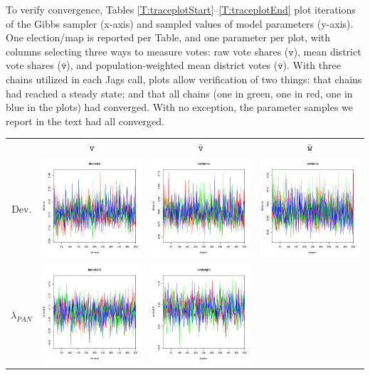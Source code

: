 \documentclass[letter,12pt]{article}
\begin{document}
To verify convergence, Tables \ref{T:traceplotStart}--\ref{T:traceplotEnd} plot iterations of the Gibbs sampler (x-axis) and sampled values of model parameters (y-axis). One election/map is reported per Table, and one parameter per plot, with columns selecting three ways to measure votes: raw vote shares ($\texttt{v}$), mean district vote shares ($\bar{\texttt{v}}$), and population-weighted mean district votes ($\bar{\texttt{v}}$). With three chains utilized in each Jags call, plots allow verification of two things: that chains had reached a steady state; and that all chains (one in green, one in red, one in blue in the plots) had converged. With no exception, the parameter samples we report in the text had all converged.

\begin{table}
\centering
\begin{tabular}{cccc}
                     & $\texttt{v}$ & $\bar{\texttt{v}}$ & $\bar{\texttt{w}}$ \\ 
    Dev.             & \includegraphics[width=.15\columnwidth]{../graphs/traceplots/2003d97v_1.pdf} &
                        \includegraphics[width=.15\columnwidth]{../graphs/traceplots/2003d97vbar_1.pdf} &
                         \includegraphics[width=.15\columnwidth]{../graphs/traceplots/2003d97wbar_1.pdf} \\
    $\lambda_{PAN}$   & \includegraphics[width=.15\columnwidth]{../graphs/traceplots/2003d97v_2.pdf} &
                        \includegraphics[width=.15\columnwidth]{../graphs/traceplots/2003d97vbar_2.pdf} &

\end{tabular}
\end{table}
\end{document}
